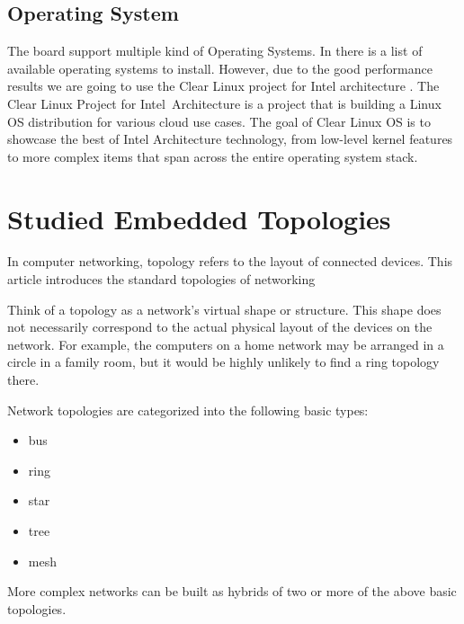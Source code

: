 \subsection{Operating System} 

The board support multiple kind of Operating Systems. In \cite{NUC-OS} there is
a list of available operating systems to install. However, due to the good
performance results \cite{phoronix-clear} we are going to use the Clear Linux
project for Intel architecture \cite{clear-linux}. The Clear Linux Project for
Intel\textregistered\ Architecture is a project that is building a Linux OS
distribution for various cloud use cases. The goal of Clear Linux OS is to
showcase the best of Intel Architecture technology, from low-level kernel
features to more complex items that span across the entire operating system
stack.


\section{Studied Embedded Topologies}

In computer networking, topology refers to the layout of connected devices. This
article introduces the standard topologies of networking

Think of a topology as a network's virtual shape or structure. This shape does
not necessarily correspond to the actual physical layout of the devices on the
network. For example, the computers on a home network may be arranged in a
circle in a family room, but it would be highly unlikely to find a ring
topology there.

Network topologies are categorized into the following basic types:

\begin{itemize}
    \item bus
    \item ring
    \item star
    \item tree
    \item mesh
\end{itemize}

More complex networks can be built as hybrids of two or more of the above basic
topologies.

